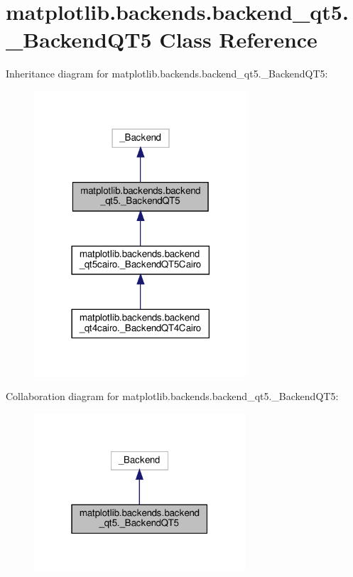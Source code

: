 \hypertarget{classmatplotlib_1_1backends_1_1backend__qt5_1_1__BackendQT5}{}\section{matplotlib.\+backends.\+backend\+\_\+qt5.\+\_\+\+Backend\+Q\+T5 Class Reference}
\label{classmatplotlib_1_1backends_1_1backend__qt5_1_1__BackendQT5}


Inheritance diagram for matplotlib.\+backends.\+backend\+\_\+qt5.\+\_\+\+Backend\+Q\+T5\+:
\nopagebreak
\begin{figure}[H]
\begin{center}
\leavevmode
\includegraphics[width=225pt]{classmatplotlib_1_1backends_1_1backend__qt5_1_1__BackendQT5__inherit__graph}
\end{center}
\end{figure}


Collaboration diagram for matplotlib.\+backends.\+backend\+\_\+qt5.\+\_\+\+Backend\+Q\+T5\+:
\nopagebreak
\begin{figure}[H]
\begin{center}
\leavevmode
\includegraphics[width=223pt]{classmatplotlib_1_1backends_1_1backend__qt5_1_1__BackendQT5__coll__graph}
\end{center}
\end{figure}
